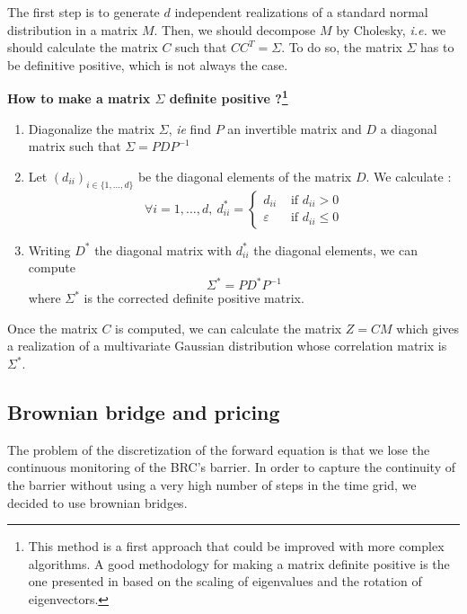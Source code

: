\documentclass[a4paper,11pt,english]{book}
\begin{document}
The first step is to generate $d$ independent realizations of a standard normal distribution in a matrix $M$. Then, we should decompose $M$ by Cholesky, \textit{i.e.} we should calculate the matrix $C$ such that $CC^{T}=\Sigma$. To do so, the matrix $\Sigma$ has to be definitive positive, which is not always the case. \\

\begin{tcolorbox}[breakable,colback=cyan,opacityfill=0.05,colframe=blue,width=\dimexpr\textwidth+12mm\relax,enlarge left by=-6mm]
\begin{center}
\vspace{0.2cm}
\textbf{How to make a matrix $\Sigma$ definite positive ?\footnote{This method is a first approach that could be improved with more complex algorithms. A good methodology for making a matrix definite positive is the one presented in \cite{jung2015scaling} based on the scaling of eigenvalues and the rotation of eigenvectors.}}
\end{center}
\begin{enumerate}
    \item Diagonalize the matrix $\Sigma$, \textit{ie} find $P$ an invertible matrix and $D$ a diagonal matrix such that $\Sigma=PDP^{-1}$
    \item Let $(d_{ii})_{i \in \{1,\ldots,d\}}$ be the diagonal elements of the matrix $D$. We calculate : $$\forall i=1,\ldots,d,~ d_{ii}^{*}=\begin{cases}
        d_{ii}& \text{ if } d_{ii}>0 \\
        \varepsilon& \text{ if } d_{ii}\leq0
    \end{cases}$$
 \item Writing $D^{*}$ the diagonal matrix with $d_{ii}^{*}$ the diagonal elements, we can compute $$\Sigma^{*}=PD^{*}P^{-1}$$ where $\Sigma^{*}$ is the corrected definite positive matrix.
\end{enumerate}
\end{tcolorbox}
Once the matrix $C$ is computed, we can calculate the matrix $Z=CM$ which gives a realization of a multivariate Gaussian distribution whose correlation matrix is $\Sigma^*$.
\subsection{Brownian bridge and pricing}
\label{subsec:brownian-bridge}
The problem of the discretization of the forward equation is that we lose the continuous monitoring of the BRC's barrier. In order to capture the continuity of the barrier without using a very high number of steps in the time grid, we decided to use brownian bridges.\\
\end{document}
